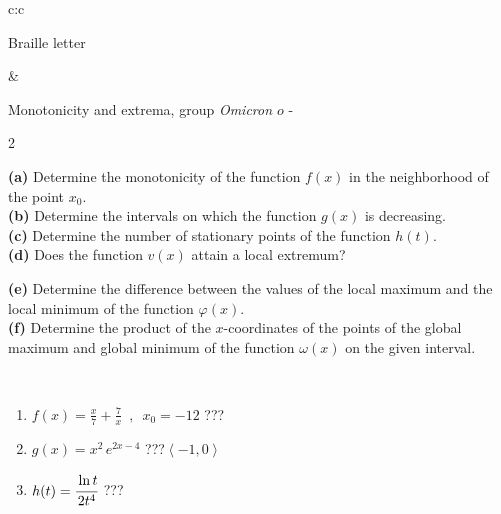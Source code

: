 \documentclass[10pt]{report}
\newcommand\omicron{o}
\begin{document}
\begin{tabular}{c:c}
\begin{minipage}[c][104.5mm][t]{0.5\linewidth}
\begin{center}
\begin{minipage}{0.20\linewidth}
\begin{center}
{\small Braille letter}
\end{center}
\end{minipage}
\end{center}
\end{minipage}
&
\begin{minipage}[c][104.5mm][t]{0.5\linewidth}
\begin{center}
\vspace{5mm}
{\huge Monotonicity and extrema, group \textit{Omicron $\omicron$} -}\\[5mm]
\begin{minipage}{0.95\linewidth}
\begin{center}
{\small \begin{multicols}{2} \raggedright
\textbf{(a)} Determine the monotonicity of the function \(f(x)\) in the neighborhood of the point \(x_0\). \\[1mm]
\textbf{(b)} Determine the intervals on which the function \(g(x)\) is decreasing. \\[1mm]
\textbf{(c)} Determine the number of stationary points of the function \(h(t)\). \\[1mm]
\textbf{(d)} Does the function \(v(x)\) attain a local extremum? \par \columnbreak
\textbf{(e)} Determine the difference between the values of the local maximum and the local minimum of the function \(\varphi(x)\). \\[1mm]
\textbf{(f)} Determine the product of the \(x\)-coordinates of the points of the global maximum and global minimum of the function \(\omega(x)\) on the given interval. \\[1mm]
\end{multicols}
}
\end{center}
\end{minipage}
\\[1mm]
\begin{minipage}{0.79\linewidth}
\begin{center}
\begin{varwidth}{\linewidth}
\setlength{\itemsep}{0pt}
\begin{enumerate}
\normalsize
\item $f(x)=\frac{x}{7}+\frac{7}{x} \enspace , \enspace x_0=-12$\quad \dotfill\; ???\;\dotfill \quad {}
\item $g(x)=x^2\, e^{2x-4}$\quad \dotfill\; ???\;\dotfill \quad $\left\langle-1 , 0\right\rangle$
\item $h(t)=\cfrac{\ln t}{2t^4}$\quad \dotfill\; ???\;\dotfill {}

\end{enumerate}
\end{varwidth}
\end{center}
\end{minipage}
\end{center}
\end{minipage}
\end{tabular}
\end{document}

